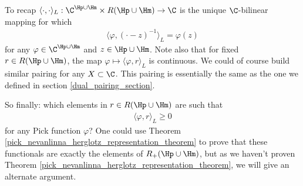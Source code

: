 To recap $\langle \cdot, \cdot \rangle_{L} : \C^{\Hp \cup \Hm} \times R(\Hp \cup \Hm) \to \C$ is the unique $\C$-bilinear mapping for which
\begin{align*}
	\langle \varphi, (\cdot - z)^{-1}\rangle_{L} = \varphi(z)
\end{align*}
for any $\varphi \in \C^{\Hp \cup \Hm}$ and $z \in \Hp \cup \Hm$. Note also that for fixed $r \in R(\Hp \cup \Hm)$, the map $\varphi \mapsto \langle \varphi, r\rangle_{L}$ is continuous. We could of course build similar pairing for any $X \subset \C$. This pairing is essentially the same as the one we defined in section \ref{dual_pairing_section}.

So finally: which elements in $r \in R(\Hp \cup \Hm)$ are such that
\begin{align*}
	\langle \varphi, r \rangle_{L} \geq 0
\end{align*}
for any Pick function $\varphi$? One could use Theorem \ref{pick_nevanlinna_herglotz_representation_theorem} to prove that these functionals are exactly the elements of $R_{+}(\Hp \cup \Hm)$, but as we haven't proven Theorem \ref{pick_nevanlinna_herglotz_representation_theorem}, we will give an alternate argument.

